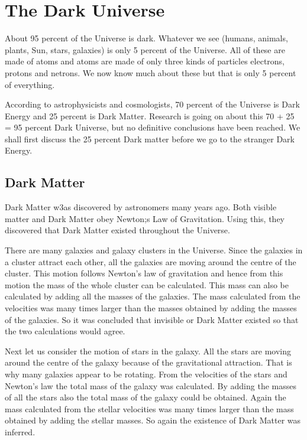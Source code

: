 \chapter[The Dark Universe]{The Dark Universe}\label{chap14}

\Authorline{}
\authinfo{}



About 95 percent of the Universe is dark. Whatever we see
(humans, animals, plants, Sun, stars, galaxies) is only
5 percent of the Universe. All of these are made of atoms
and atoms are made of only three kinds of particles electrons,
protons and netrons. We now know much about these but that is
only 5 percent of everything.

According to astrophysicists and cosmologists, 70 percent of
the Universe is Dark Energy and 25 percent is Dark Matter.
Research is going on about this 70 + 25 = 95 percent Dark
Universe, but no definitive conclusions have been reached.
We shall first discuss the 25 percent Dark matter before we
go to the stranger Dark Energy.

\section*{Dark Matter}

Dark Matter w3as discovered by astronomers many years ago.
Both visible matter and Dark Matter obey Newton;s Law of
Gravitation. Using this, they discovered that Dark Matter
existed throughout the Universe.

There are many galaxies and galaxy clusters in the Universe.
Since the galaxies in a cluster attract each other, all
the galaxies are moving around the centre of the cluster.
This motion follows Newton's law of gravitation and hence
from this motion the mass of the whole cluster can be
calculated. This mass can also be calculated by adding all
the masses of the galaxies. The mass calculated from the
velocities was many times larger than the masses obtained
by adding the masses of the galaxies. So it was concluded
that invisible or Dark Matter existed so that the two
calculations would agree.

Next let us consider the motion of stars in the galaxy.
All the stars are moving around the centre of the galaxy
because of the gravitational attraction. That is why
many galaxies appear to be rotating. From the velocities
of the stars and Newton's law the total mass of the
galaxy was calculated. By adding the masses of all the
stars also the total mass of the galaxy could be obtained.
Again the mass calculated from the stellar velocities
was many times larger than the mass obtained by adding
the stellar masses. So again the existence of Dark Matter
was inferred.

